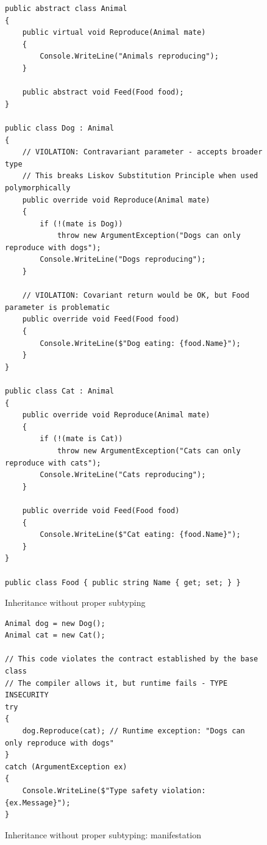 \begin{figure}
    \centering
    \begin{verbatim}
public abstract class Animal
{
    public virtual void Reproduce(Animal mate)
    {
        Console.WriteLine("Animals reproducing");
    }
    
    public abstract void Feed(Food food);
}

public class Dog : Animal
{
    // VIOLATION: Contravariant parameter - accepts broader type
    // This breaks Liskov Substitution Principle when used polymorphically
    public override void Reproduce(Animal mate)
    {
        if (!(mate is Dog))
            throw new ArgumentException("Dogs can only reproduce with dogs");
        Console.WriteLine("Dogs reproducing");
    }
    
    // VIOLATION: Covariant return would be OK, but Food parameter is problematic
    public override void Feed(Food food)
    {
        Console.WriteLine($"Dog eating: {food.Name}");
    }
}

public class Cat : Animal
{
    public override void Reproduce(Animal mate)
    {
        if (!(mate is Cat))
            throw new ArgumentException("Cats can only reproduce with cats");
        Console.WriteLine("Cats reproducing");
    }
    
    public override void Feed(Food food)
    {
        Console.WriteLine($"Cat eating: {food.Name}");
    }
}

public class Food { public string Name { get; set; } }
    \end{verbatim}
    \caption{Inheritance without proper subtyping}
    \label{fig:csharp-inheritance-without-proper-subtyping}
\end{figure}

\begin{figure}
    \centering
    \begin{verbatim}
Animal dog = new Dog();
Animal cat = new Cat();

// This code violates the contract established by the base class
// The compiler allows it, but runtime fails - TYPE INSECURITY
try
{
    dog.Reproduce(cat); // Runtime exception: "Dogs can only reproduce with dogs"
}
catch (ArgumentException ex)
{
    Console.WriteLine($"Type safety violation: {ex.Message}");
}
    \end{verbatim}
    \caption{Inheritance without proper subtyping: manifestation}
    \label{fig:csharp-inheritance-without-proper-subtyping-manifestation}
\end{figure}

